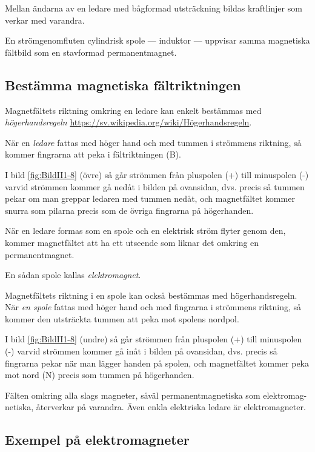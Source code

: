 Mellan ändarna av en ledare med bågformad utsträckning bildas kraftlinjer som
verkar med varandra.

En strömgenomfluten cylindrisk spole --- induktor --- uppvisar samma magnetiska
fältbild som en stavformad permanentmagnet.

\subsection{Bestämma magnetiska fältriktningen}

Magnetfältets riktning omkring en ledare kan enkelt bestämmas med
\emph{högerhandsregeln}
\url{https://sv.wikipedia.org/wiki/Högerhandsregeln}.

När en \emph{ledare} fattas med höger hand och med tummen i strömmens
riktning, så kommer fingrarna att peka i fältriktningen (B).

I bild \ref{fig:BildII1-8} (övre) så går strömmen från pluspolen (+) till
minuspolen (-) varvid strömmen kommer gå nedåt i bilden på ovansidan,
dvs. precis så tummen pekar om man greppar ledaren med tummen nedåt, och
magnetfältet kommer snurra som pilarna precis som de övriga fingrarna på
högerhanden.

När en ledare formas som en spole och en elektrisk ström flyter genom den,
kommer magnetfältet att ha ett utseende som liknar det omkring en
permanentmagnet.

En sådan spole kallas \emph{elektromagnet}.

Magnetfältets riktning i en spole kan också bestämmas med högerhandsregeln.
När \emph{en spole} fattas med höger hand och med fingrarna i strömmens
riktning, så kommer den utsträckta tummen att peka mot spolens nordpol.

I bild \ref{fig:BildII1-8} (undre) så går strömmen från pluspolen (+) till minuspolen
(-) varvid strömmen kommer gå inåt i bilden på ovansidan, dvs. precis så
fingrarna pekar när man lägger handen på spolen, och magnetfältet kommer peka
mot nord (N) precis som tummen på högerhanden.

Fälten omkring alla slags magneter, såväl permanentmagnetiska som elektromag-
netiska, återverkar på varandra. Även enkla
elektriska ledare är elektromagneter.

\clearpage

\subsection{Exempel på elektromagneter}


